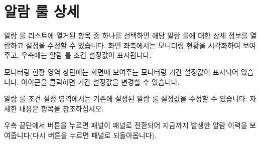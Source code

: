 \documentclass[letterpaper,10pt,english]{sphinxmanual}
\begin{document}
\section{알람 룰 상세}
\label{\detokenize{part04/index:alarm-rule-details}}\label{\detokenize{part04/index:id3}}
알람 룰 리스트에 열거된 항목 중 하나를 선택하면 해당 알람 룰에 대한 상세 정보를 열람하고 설정을 수정할 수 있습니다. 화면 좌측에서는 모니터링 현황을 시각화하여 보여주고, 우측에는 알람 룰 조건 설정값이 표시됩니다.
\begin{quote}

\begin{figure}[H]
\centering

\noindent{}
\end{figure}
\end{quote}

모니터링 현황 영역 상단에는 화면에 보여주는 모니터링 기간 설정값이 표시되어 있습니다.  아이콘을 클릭하면 기간 설정값을 변경할 수 있습니다.
\begin{quote}

\begin{figure}[H]
\centering

\noindent{}
\end{figure}
\end{quote}

알람 룰 조건 설정 영역에서는 기존에 설정된 알람 룰 설정값을 수정할 수 있습니다. 자세한 내용은 {\hyperref[\detokenize{part02/index:alarm-rule-settings}]{}} 항목을 참조하십시오.
\begin{quote}

\begin{figure}[H]
\centering

\noindent{}
\end{figure}
\end{quote}

우측 끝단에서  버튼을 누르면  패널이  패널로 전환되어 지금까지 발생한 알람 이력을 보여줍니다(다시  버튼을 누르면  패널로 되돌아옵니다).
\begin{quote}

\begin{figure}[H]
\centering

\noindent{}
\end{figure}
\end{quote}
\end{document}
